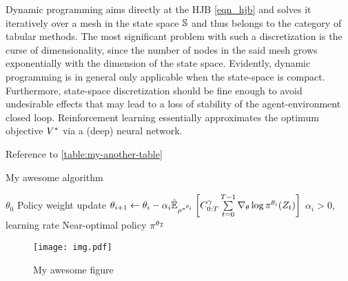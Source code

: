 \documentclass[12pt,twoside]{../../mitthesis}
\begin{document}
Dynamic programming aims directly at the HJB \eqref{eqn_hjb} and solves it iteratively over a mesh in the state space $\states$ and thus belongs to the category of tabular methods.
The most significant problem with such a discretization is the curse of dimensionality, since the number of nodes in the said mesh grows exponentially with the dimension of the state space.
Evidently, dynamic programming is in general only applicable when the state-space is compact.
Furthermore, state-space discretization should be fine enough to avoid undesirable effects that may lead to a loss of stability of the agent-environment closed loop.
Reinforcement learning essentially approximates the optimum objective $\Value^*$ via a (deep) neural network.

Reference to \ref{table:my-another-table}


\begin{algorithm}
\caption{My awesome algorithm}
\label{alg:my-alg}
\begin{algorithmic}
 $\theta_0$
    \STATE Policy weight update
    \STATE $\theta_{i+1} \la \theta_i - \alpha_i \Es[\trajpdf^{\policy^{\theta_i}}]{ \Cost^\gamma_{0:T} \sum \limits_{t=0}^{T-1} \nabla_\theta \log \policy^{\theta_i} ( \Traj_t ) }$
    \STATE $\alpha_i > 0$, learning rate
\ENDFOR
\STATE \RETURN Near-optimal policy $\policy^{\theta_{\mathcal I}}$
\end{algorithmic}
\end{algorithm}

\begin{figure}
    \texttt{[image: img.pdf]}
    \caption{My awesome figure}
    \label{fig:my-fig}
\end{figure}

\printbibliography
%
%
\end{document}
